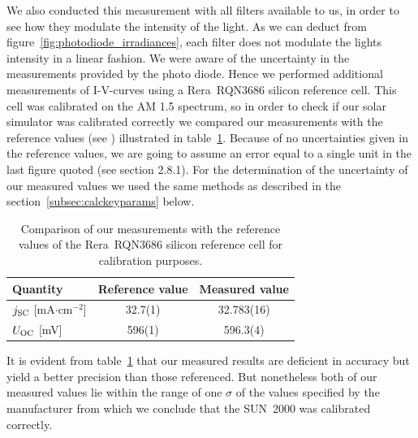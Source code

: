 \documentclass[a4paper,10pt,twocolumn]{article}
\begin{document}
\begin{extract*}
We also conducted this measurement with all filters available to us, in order to see how they modulate the intensity of the light. As we can deduct from figure~\ref{fig:photodiode_irradiances}, each filter does not modulate the lights intensity in a linear fashion.\mypar
We were aware of the uncertainty in the measurements provided by the photo diode. Hence we performed additional measurements of I-V-curves using a Rera~RQN3686 silicon reference cell. This cell was calibrated on the AM 1.5 spectrum, so in order to check if our solar simulator was calibrated correctly we compared our measurements with the reference values (see \cite{reracat}) illustrated in table~\ref{tab:reracomp}. Because of no uncertainties given in the reference values, we are going to assume an error equal to a single unit in the last figure quoted (see \cite{measurements} section 2.8.1). For the determination of the uncertainty of our measured values we used the same methods as described in the section~\ref{subsec:calckeyparams} below. 
\begin{table}[h]\centering
	\caption{Comparison of our measurements with the reference values of the Rera~RQN3686 silicon reference cell for calibration purposes.}
	\label{tab:reracomp}
	\begin{tabular}{@{}lcc@{}}\toprule
		Quantity & Reference value & Measured value\\ \midrule
		$j_{\text{SC}}$ [mA$\cdot$cm$^{-2}$] & 32.7(1) & 32.783(16) \\
		$U_{\text{OC}}$ [mV]& 596(1) & 596.3(4) \\ \bottomrule
	\end{tabular}
\end{table}

It is evident from table~\ref{tab:reracomp} that our measured results are deficient in accuracy but yield a better precision than those referenced. But nonetheless both of our measured values lie within the range of one $\sigma$ of the values specified by the manufacturer from which we conclude that the SUN~2000 was calibrated correctly.



\end{extract*}
\end{document}
